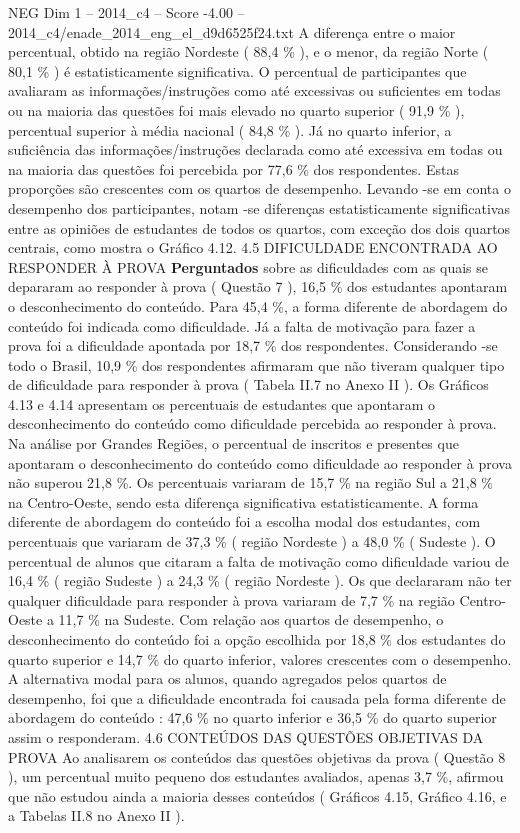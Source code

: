 \begin{textsample}{NEG Dim 1 – 2014\_c4 – Score -4.00 – 2014\_c4/enade\_2014\_eng\_el\_d9d6525f24.txt}
A diferença entre o maior percentual, obtido na região Nordeste ( 88,4 \% ), e o menor, da região Norte ( 80,1 \% ) é estatisticamente significativa.
O percentual de participantes que avaliaram as informações/instruções como até excessivas ou suficientes em todas ou na maioria das questões foi mais elevado no quarto superior ( 91,9 \% ), percentual superior à média nacional ( 84,8 \% ).
Já no quarto inferior, a suficiência das informações/instruções declarada como até excessiva em todas ou na maioria das questões foi percebida por 77,6 \% dos respondentes.
Estas proporções são crescentes com os quartos de desempenho.
Levando -se em conta o desempenho dos participantes, notam -se diferenças estatisticamente significativas entre as opiniões de estudantes de todos os quartos, com exceção dos dois quartos centrais, como mostra o Gráfico 4.12. 4.5 DIFICULDADE ENCONTRADA AO RESPONDER À PROVA \textbf{Perguntados} sobre as dificuldades com as quais se depararam ao responder à prova ( Questão 7 ), 16,5 \% dos estudantes apontaram o desconhecimento do conteúdo.
Para 45,4 \%, a forma diferente de abordagem do conteúdo foi indicada como dificuldade.
Já a falta de motivação para fazer a prova foi a dificuldade apontada por 18,7 \% dos respondentes.
Considerando -se todo o Brasil, 10,9 \% dos respondentes afirmaram que não tiveram qualquer tipo de dificuldade para responder à prova ( Tabela II.7 no Anexo II ).
Os Gráficos 4.13 e 4.14 apresentam os percentuais de estudantes que apontaram o desconhecimento do conteúdo como dificuldade percebida ao responder à prova.
Na análise por Grandes Regiões, o percentual de inscritos e presentes que apontaram o desconhecimento do conteúdo como dificuldade ao responder à prova não superou 21,8 \%.
Os percentuais variaram de 15,7 \% na região Sul a 21,8 \% na Centro-Oeste, sendo esta diferença significativa estatisticamente.
A forma diferente de abordagem do conteúdo foi a escolha modal dos estudantes, com percentuais que variaram de 37,3 \% ( região Nordeste ) a 48,0 \% ( Sudeste ).
O percentual de alunos que citaram a falta de motivação como dificuldade variou de 16,4 \% ( região Sudeste ) a 24,3 \% ( região Nordeste ).
Os que declararam não ter qualquer dificuldade para responder à prova variaram de 7,7 \% na região Centro-Oeste a 11,7 \% na Sudeste.
Com relação aos quartos de desempenho, o desconhecimento do conteúdo foi a opção escolhida por 18,8 \% dos estudantes do quarto superior e 14,7 \% do quarto inferior, valores crescentes com o desempenho.
A alternativa modal para os alunos, quando agregados pelos quartos de desempenho, foi que a dificuldade encontrada foi causada pela forma diferente de abordagem do conteúdo : 47,6 \% no quarto inferior e 36,5 \% do quarto superior assim o responderam. 4.6 CONTEÚDOS DAS QUESTÕES OBJETIVAS DA PROVA Ao analisarem os conteúdos das questões objetivas da prova ( Questão 8 ), um percentual muito pequeno dos estudantes avaliados, apenas 3,7 \%, afirmou que não estudou ainda a maioria desses conteúdos ( Gráficos 4.15, Gráfico 4.16, e a Tabelas II.8 no Anexo II ).

\end{textsample}
